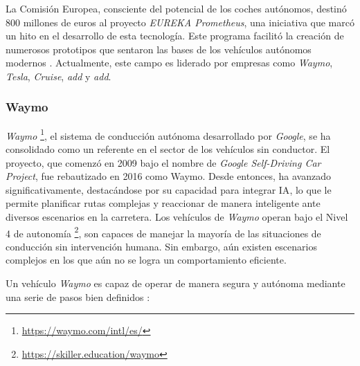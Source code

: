 La Comisión Europea, consciente del potencial de los coches autónomos, destinó 800 millones de euros al proyecto  \textit{EUREKA Prometheus}, una iniciativa que marcó un hito en el desarrollo de esta tecnología. Este programa facilitó la creación de numerosos prototipos que sentaron las bases de los vehículos autónomos modernos \cite{history-vehicles}. Actualmente, este campo es liderado por empresas como \textit{Waymo}, \textit{Tesla}, \textit{Cruise}, \textit{add}  y  \textit{add}.

\subsubsection{Waymo}

\textit{ Waymo} \footnote{\url{https://waymo.com/intl/es/}}, el sistema de conducción autónoma desarrollado por \textit{ Google}, se ha consolidado como un referente en el sector de los vehículos sin conductor. El proyecto, que comenzó en 2009 bajo el nombre de \textit{ Google Self-Driving Car Project}, fue rebautizado en 2016 como {Waymo}. Desde entonces, ha avanzado significativamente, destacándose por su capacidad para integrar \ac{IA}, lo que le permite planificar rutas complejas y reaccionar de manera inteligente ante diversos escenarios en la carretera. Los vehículos de \textit{Waymo} operan bajo el Nivel 4 de autonomía \footnote{\url { https://skiller.education/waymo}}, son capaces de manejar la mayoría de las situaciones de conducción sin intervención humana. Sin embargo, aún existen escenarios complejos en los que aún no se logra un comportamiento eficiente.

Un vehículo \textit{Waymo} es capaz de operar de manera segura y autónoma mediante una serie de pasos bien definidos \cite{ai-self-driving-cars}:

